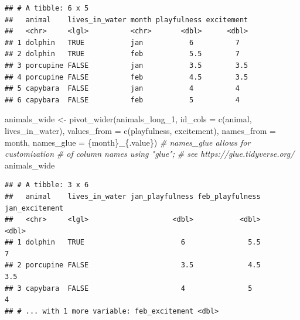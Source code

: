 \documentclass[
]{book}
\newenvironment{Shaded}{\begin{snugshade}}{\end{snugshade}}
\newcommand{\AttributeTok}[1]{\textcolor[rgb]{0.77,0.63,0.00}{#1}}
\newcommand{\CommentTok}[1]{\textcolor[rgb]{0.56,0.35,0.01}{\textit{#1}}}
\newcommand{\FunctionTok}[1]{\textcolor[rgb]{0.00,0.00,0.00}{#1}}
\newcommand{\NormalTok}[1]{#1}
\newcommand{\OtherTok}[1]{\textcolor[rgb]{0.56,0.35,0.01}{#1}}
\newcommand{\StringTok}[1]{\textcolor[rgb]{0.31,0.60,0.02}{#1}}
\begin{document}
\begin{verbatim}
## # A tibble: 6 x 5
##   animal    lives_in_water month playfulness excitement
##   <chr>     <lgl>          <chr>       <dbl>      <dbl>
## 1 dolphin   TRUE           jan           6          7  
## 2 dolphin   TRUE           feb           5.5        7  
## 3 porcupine FALSE          jan           3.5        3.5
## 4 porcupine FALSE          feb           4.5        3.5
## 5 capybara  FALSE          jan           4          4  
## 6 capybara  FALSE          feb           5          4
\end{verbatim}

\begin{Shaded}
\begin{Highlighting}[]
\NormalTok{animals\_wide }\OtherTok{\textless{}{-}} \FunctionTok{pivot\_wider}\NormalTok{(animals\_long\_1,}
                            \AttributeTok{id\_cols =} \FunctionTok{c}\NormalTok{(}\StringTok{\textquotesingle{}animal\textquotesingle{}}\NormalTok{, }
                                        \StringTok{\textquotesingle{}lives\_in\_water\textquotesingle{}}\NormalTok{),}
                            \AttributeTok{values\_from =} \FunctionTok{c}\NormalTok{(}\StringTok{\textquotesingle{}playfulness\textquotesingle{}}\NormalTok{,}
                                            \StringTok{\textquotesingle{}excitement\textquotesingle{}}\NormalTok{),}
                            \AttributeTok{names\_from =} \StringTok{\textquotesingle{}month\textquotesingle{}}\NormalTok{,}
                            \AttributeTok{names\_glue =} \StringTok{\textquotesingle{}\{month\}\_\{.value\}\textquotesingle{}}\NormalTok{) }
                            \CommentTok{\# \textasciigrave{}names\_glue\textasciigrave{} allows for customization }
                            \CommentTok{\# of column names using "glue";}
                            \CommentTok{\# see https://glue.tidyverse.org/}
\NormalTok{animals\_wide}
\end{Highlighting}
\end{Shaded}

\begin{verbatim}
## # A tibble: 3 x 6
##   animal    lives_in_water jan_playfulness feb_playfulness jan_excitement
##   <chr>     <lgl>                    <dbl>           <dbl>          <dbl>
## 1 dolphin   TRUE                       6               5.5            7  
## 2 porcupine FALSE                      3.5             4.5            3.5
## 3 capybara  FALSE                      4               5              4  
## # ... with 1 more variable: feb_excitement <dbl>
\end{verbatim}
\end{document}
